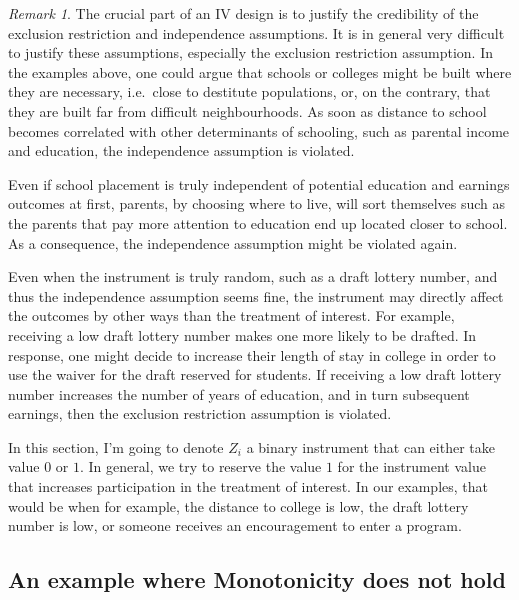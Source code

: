 \documentclass[
]{book}
\theoremstyle{definition}
\theoremstyle{definition}
\theoremstyle{definition}
\theoremstyle{definition}
\theoremstyle{remark}
\newtheorem*{remark}{Remark}
\begin{document}
\begin{remark}
\iffalse{} {Remark. } \fi{}The crucial part of an IV design is to justify the credibility of the exclusion restriction and independence assumptions.
It is in general very difficult to justify these assumptions, especially the exclusion restriction assumption.
In the examples above, one could argue that schools or colleges might be built where they are necessary, i.e.~close to destitute populations, or, on the contrary, that they are built far from difficult neighbourhoods.
As soon as distance to school becomes correlated with other determinants of schooling, such as parental income and education, the independence assumption is violated.

Even if school placement is truly independent of potential education and earnings outcomes at first, parents, by choosing where to live, will sort themselves such as the parents that pay more attention to education end up located closer to school.
As a consequence, the independence assumption might be violated again.

Even when the instrument is truly random, such as a draft lottery number, and thus the independence assumption seems fine, the instrument may directly affect the outcomes by other ways than the treatment of interest.
For example, receiving a low draft lottery number makes one more likely to be drafted.
In response, one might decide to increase their length of stay in college in order to use the waiver for the draft reserved for students.
If receiving a low draft lottery number increases the number of years of education, and in turn subsequent earnings, then the exclusion restriction assumption is violated.
\end{remark}

In this section, I'm going to denote \(Z_i\) a binary instrument that can either take value \(0\) or \(1\).
In general, we try to reserve the value \(1\) for the instrument value that increases participation in the treatment of interest.
In our examples, that would be when for example, the distance to college is low, the draft lottery number is low, or someone receives an encouragement to enter a program.

\hypertarget{an-example-where-monotonicity-does-not-hold}{%
\subsection{An example where Monotonicity does not hold}\label{an-example-where-monotonicity-does-not-hold}}
\end{document}
